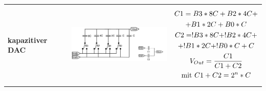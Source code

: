 \begin{longtable}{|l|l|l|}
\begin{minipage}{8cm}
\end{minipage}
\\
\hline

\begin{minipage}{4cm}
\textbf{kapazitiver DAC}
\end{minipage}
&
\begin{minipage}{6cm}
\includegraphics[width=6cm, height = 3.5cm]{pictures/kapazitiverDAC}
\end{minipage}
&
\begin{minipage}{8cm}
\begin{gather}
C1=B3*8C+B2*4C+\notag\\+B1*2C+B0*C\\
C2=!B3*8C+!B2*4C+\notag\\+!B1*2C+!B0*C+C\\
V_{Out}=\frac{C1}{C1+C2}\\
\text{mit } C1+C2=2^n*C
\end{gather}

\end{minipage}
\\
\hline
\end{longtable}
\newpage

